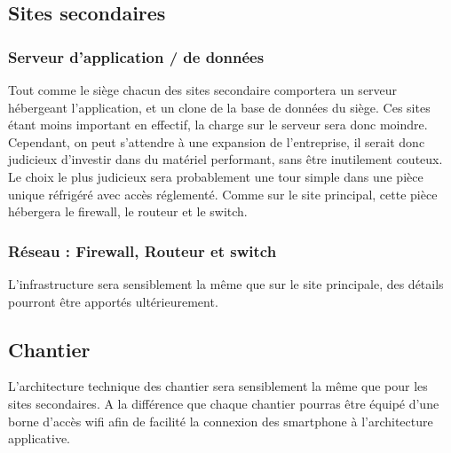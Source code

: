     \subsection{Sites secondaires}

        \subsubsection{Serveur d'application / de données}
            Tout comme le siège chacun des sites secondaire comportera un serveur hébergeant l'application, et un clone de la base de données du siège. Ces sites étant moins important en effectif, la charge sur le serveur sera donc moindre. Cependant, on peut s'attendre à une expansion de l'entreprise, il serait donc judicieux d'investir dans du matériel performant, sans être inutilement couteux. Le choix le plus judicieux sera probablement une tour simple dans une pièce unique réfrigéré avec accès réglementé. Comme sur le site principal, cette pièce hébergera le firewall, le routeur et le switch.

        \subsubsection{Réseau : Firewall, Routeur et switch}
            L'infrastructure sera sensiblement la même que sur le site principale, des détails pourront être apportés ultérieurement.

    \subsection{Chantier}
        L'architecture technique des chantier sera sensiblement la même que pour les sites secondaires.
        A la différence que chaque chantier pourras être équipé d'une borne d'accès wifi afin de facilité la connexion des smartphone à l'architecture applicative.




